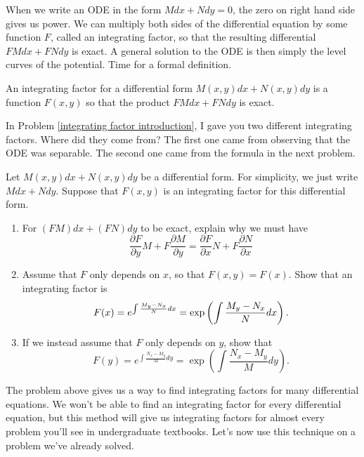 When we write an ODE in the form $Mdx+Ndy=0$, the zero on right hand side gives us power. We can multiply both sides of the differential equation by some function $F$, called an integrating factor, so that the resulting differential $FMdx+FNdy$ is exact. A general solution to the ODE is then simply the level curves of the potential. Time for a formal definition.

\begin{definition}
 An integrating factor for a differential form $M(x,y)dx+N(x,y)dy$ is a function $F(x,y)$ so that the product $FMdx+FNdy$ is exact.
\end{definition}

In Problem \ref{integrating factor introduction}, I gave you two different integrating factors. Where did they come from? The first one came from observing that the ODE was separable. The second one came from the formula in the next problem.

\begin{problem}\label{integrating factor that depends only on x}
Let $M(x,y)dx+N(x,y)dy$ be a differential form.  For simplicity, we just write $Mdx+Ndy$.  Suppose that $F(x,y)$ is an integrating factor for this differential form.
\begin{enumerate}
 \item {}%
For $(FM)dx+(FN)dy$ to be exact, explain why we must have 
$$
\dfrac{\partial F}{\partial y}M+F\dfrac{\partial M}{\partial y} 
= 
\dfrac{\partial F}{\partial x}N+F\dfrac{\partial N}{\partial x} 
$$
\item 
{}%
Assume that $F$ only depends on $x$, so that $F(x,y)=F(x)$. Show that an integrating factor is
$$\displaystyle F(x)=e^{\int \frac{M_y-N_x}{N} dx} = \exp\left(\int \frac{M_y-N_x}{N} dx\right).$$
\item If we instead assume that $F$ only depends on $y$, show that 
$$F(y)=e^{\int \frac{N_x-M_y}{M} dy} = \exp\left(\int \frac{N_x-M_y}{M} dy\right).$$
\end{enumerate}
 
\end{problem}

The problem above gives us a way to find integrating factors for many differential equations. We won't be able to find an integrating factor for every differential equation, but this method will give us integrating factors for almost every problem you'll see in undergraduate textbooks. Let's now use this technique on a problem we've already solved.

